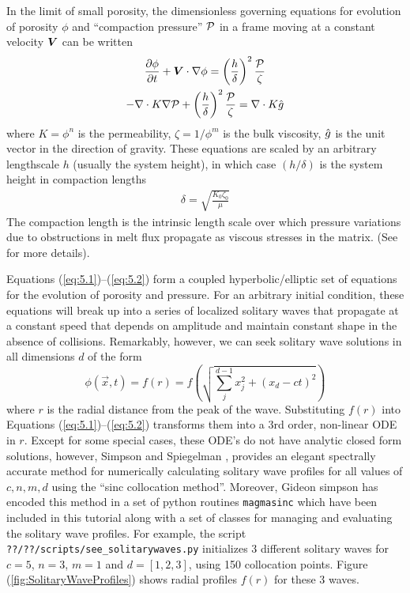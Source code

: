 In the limit of small porosity, the dimensionless governing equations for evolution
of porosity $\phi$ and ``compaction pressure'' $\mathcal{P}$ in a frame
moving at a constant velocity ${\mbox{\boldmath$V$}}$ can be written
\begin{gather}
  \frac{\partial\phi}{\partial t} + {\mbox{\boldmath$V$}}\cdot\nabla\phi = 
  \left(
    \frac{h}{\delta}
  \right)^{2}\frac{\mathcal{P}}{\zeta}  \label{eq:5.1}\\
-\nabla\cdot K \nabla\mathcal{P} + \left(
    \frac{h}{\delta}
  \right)^{2}\frac{\mathcal{P}}{\zeta} = \nabla\cdot K \hat{g}    \label{eq:5.2}
\end{gather}
where $K=\phi^{n}$ is the permeability, $\zeta = 1/\phi^{m}$ is the
bulk viscosity, $\hat{g}$ is the unit vector in the direction of
gravity.  These equations are scaled by an arbitrary lengthscale $h$
(usually the system height), in which case  $(h/\delta)$ is  the
system height  in compaction lengths
\begin{gather}
  \delta = \sqrt{\frac{K_{0}\zeta_0}{\mu}}
\end{gather}
The compaction length is the intrinsic length scale over which
pressure variations due to obstructions in melt flux propagate as
viscous stresses in the matrix. (See
\cite{spiegelman_flow_1993,spiegelman_flow_1993-1} for more details).

Equations (\ref{eq:5.1})--(\ref{eq:5.2}) form a coupled
hyperbolic/elliptic set of equations for the evolution of porosity and
pressure.  For an arbitrary initial condition, these equations will
break up into a series of localized solitary waves that propagate at a
constant speed that depends on amplitude and maintain constant shape
in the absence of collisions.  Remarkably, however,  we can seek
solitary wave solutions in all dimensions $d$  of the form
\begin{equation}
  \label{eq:5.4}
  \phi(\vec{x},t) = f(r) = f
  \left(
    \sqrt{\sum_{j}^{d-1} x_{j}^{2} + (x_{d} -ct)^{2}}
  \right)
\end{equation}
where $r$ is the radial distance from the peak of the wave.
Substituting $f(r)$ into Equations (\ref{eq:5.1})--(\ref{eq:5.2})
transforms them into a 3rd order, non-linear ODE in $r$.  Except for
some special cases,  these ODE's do not have analytic closed form
solutions, however,  Simpson and Spiegelman
\cite{simpson_solitary_2011}, provides an elegant spectrally accurate
method for numerically calculating solitary wave profiles for all
values of $c,n,m,d$ using the ``sinc collocation method''.  Moreover,
Gideon simpson has encoded this method in a set of python routines
\texttt{magmasinc} which have been included in this tutorial along
with a set of classes for managing and evaluating the solitary wave
profiles.  For example, the script
\texttt{??/??/scripts/see\_solitarywaves.py} initializes 3 different
solitary waves for $c=5$, $n=3$, $m=1$ and $d=[1,2,3]$, using 150
collocation points.  Figure (\ref{fig:SolitaryWaveProfiles}) shows radial profiles $f(r)$ for these
3 waves.  

